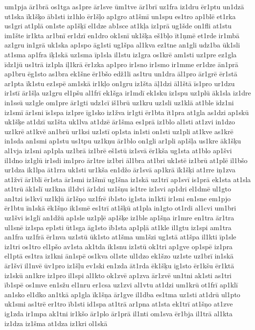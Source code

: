 {um1pja
ār1brā
os1tga
as1pre
ār1sve
ūm1tve
ār1brī
uz1fra
iz1dru
ēr1ptu
un1dzā
ut1ska
īk1šķo
āb1sti
iz1hlo
ēr1šļo
ap1gro
at1šmī
un1spu
es1tro
ap1blē
et1rka
us1gri
at1plā
on1ste
ap1šķī
el1dze
ab1sce
at1kļa
iz1prā
ug1šde
on1fli
at1stu
im1šte
ir1kta
ar1bnī
er1dzī
en1dro
ok1snī
uk1šķa
eš1bļo
īt1ņmē
et1rde
ir1mbā
az1gru
in1grā
uk1ska
ap1spo
āg1sti
ug1špa
al1kva
ez1tne
an1gli
udz1ba
ūk1sli
at1sma
ap1fra
iķ1skā
uz1sma
īp1sla
il1stu
iz1gra
os1krē
am1sti
uz1pre
ez1gla
īdz1jū
us1trā
iz1pla
iļ1krā
ēr1zka
ap1pro
ir1sno
ir1smo
ir1mme
er1dze
ān1prā
ap1bru
ēg1sto
as1bra
ek1šne
ēr1bšo
edž1li
as1tru
un1dra
āl1pro
ār1grē
ēr1stā
ar1pta
īk1stu
ez1spē
am1skā
ir1kļo
on1gru
iz1šta
āļ1dzi
āl1štā
īs1pro
ur1dzu
ir1stī
ār1šļa
uz1gru
el1pšu
al1frī
ek1šga
ir1mdī
ek1sku
iz1spu
uz1plū
āk1sla
iz1dre
in1ssū
uz1gle
om1pre
ār1gti
udz1cī
iš1brū
uz1kru
uz1sli
uz1klā
at1ble
īdz1ni
iz1smī
ār1sni
īs1spa
iz1pre
īg1sko
iz1žva
ir1gti
ēr1bta
īt1pra
at1gla
as1dzi
ap1skū
uk1šķe
at1dzī
uz1šta
uk1lva
at1dzē
ār1šma
es1prā
iz1blo
al1sti
at1zvi
in1dzo
uz1krē
at1kvē
an1brū
ur1ksi
uz1stī
op1sta
in1sti
on1sti
uz1pli
at1kve
as1krē
in1sda
an1smi
ap1stu
us1tpu
uz1kņu
ār1blo
on1gli
ar1pli
ap1šļa
us1kre
āk1šķu
al1vja
iz1sni
ap1pla
uz1brā
iz1brē
eš1stū
iz1svā
ēr1kša
ug1sta
at1blo
ap1švi
il1dno
iz1glū
ir1sdi
im1pro
ār1tre
iz1bri
āl1bra
at1bri
uk1stē
iz1brū
at1plē
il1bšo
ur1dza
ik1lpa
āt1rra
uk1sti
ur1kša
en1džo
ār1svā
ap1krā
īk1šķi
at1rre
iņ1zva
at1žvī
ār1blī
ēr1sta
ār1smi
iz1šmī
ug1šna
iz1skā
uz1trī
ap1svī
is1prā
ek1sta
at1sla
at1trū
āk1slī
uz1kna
il1dvi
ār1dzi
uz1šņu
is1tre
iz1svi
ap1dri
el1dmē
ul1gto
an1tzi
is1kvī
uz1kļū
ār1šņo
uz1frē
ib1sto
ig1sta
in1ktī
ir1sni
en1sne
em1pjo
ēr1btu
īn1skā
ēk1šņo
ik1smē
es1trī
at1šķū
at1pla
in1gto
ot1rdi
al1cvi
um1bri
uz1švi
is1glī
an1džū
ap1sle
uz1pļē
ap1šķe
iz1ble
ap1šņa
ir1mre
en1tra
ār1tra
ul1snē
iz1spa
ep1sti
ūt1sga
āg1sto
īb1sta
ap1pļā
at1kle
il1gtu
iz1spi
am1tra
an1fra
uz1frā
ēr1nva
uz1stū
ūk1sto
at1šma
um1šzi
ug1stā
at1špa
il1kti
īp1sle
iz1tri
os1tro
el1pšo
av1sta
ak1tda
ik1snu
iz1stū
ok1tri
ap1gve
op1spē
iz1pra
el1ptā
es1tra
iz1kni
ān1spē
os1kva
ol1ste
ul1dzo
ek1šzo
uz1ste
uz1brī
in1skā
ār1švī
il1nvē
ūv1pro
iz1šļu
ev1ski
en1zda
āt1rda
ēk1šķu
ig1sto
ēr1kšu
ēr1ktā
iz1skū
an1kre
iz1pro
il1spi
al1kto
ok1zvē
ap1zva
ār1zvē
un1tni
ak1sti
as1tri
īb1spē
os1mve
en1sžu
el1nru
er1csa
uz1zvi
al1vtu
at1dzi
um1krū
ot1frī
ap1klī
an1sko
el1dko
an1tkā
ap1gla
īk1šņa
ār1gve
il1dba
es1tma
uz1sti
at1drū
ul1pto
uk1smi
as1trē
er1tro
īb1sti
id1spa
at1trā
ar1pna
at1sta
ek1trī
at1šņo
at1zve
ig1zda
ir1mpa
ak1tni
ir1kšo
ār1plo
ār1prā
il1nti
om1sva
ēr1bja
il1trā
al1kta
iz1dza
iz1šma
at1dza
iz1kri
ol1skā
}
